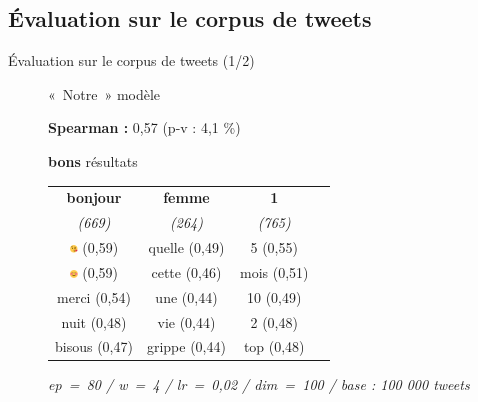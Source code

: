 \documentclass[10pt,xcolor=table,color={dvipsnames,usenames},ignorenonframetext,usepdftitle=false,french]{beamer}
\begin{document}
\hypertarget{uxe9valuation-sur-le-corpus-de-tweets}{%
\subsection{Évaluation sur le corpus de
tweets}\label{uxe9valuation-sur-le-corpus-de-tweets}}

\begin{frame}{Évaluation sur le corpus de tweets (1/2)}
\protect\hypertarget{uxe9valuation-sur-le-corpus-de-tweets-12}{}

\begin{figure}
\begin{minipage}{.4\textwidth}


« Notre » modèle

\medskip

\footnotesize
\textbf{ Spearman : } 0,57 (p-v : 4,1 \%)
\normalsize

\medskip

\faArrowCircleRight{} \textbf{bons} résultats


\end{minipage}%
\begin{minipage}{.6\textwidth}
\footnotesize

\begin{table}[!h]
\begin{center}
\begin{tabular}{|c|c|c|c|}
    \hline
\textbf{bonjour} & \textbf{femme} & \textbf{1} \tabularnewline
\emph{(669)} & \emph{(264)} & \emph{(765)} \tabularnewline
       \hline
\includegraphics[height=2mm]{img/emojis/1.png} (0,59) & quelle (0,49) & 5 (0,55) \tabularnewline
\includegraphics[height=2mm]{img/emojis/2.png} (0,59) & cette (0,46) & mois (0,51) \tabularnewline
merci (0,54) & une (0,44) & 10 (0,49) \tabularnewline
nuit (0,48) & vie (0,44) & 2 (0,48) \tabularnewline
bisous (0,47) & grippe (0,44) & top (0,48) \tabularnewline
    \hline
 \end{tabular}
\captionsetup{margin=0cm,format=hang,justification=justified}

\end{center}
\tiny
\emph{ep = 80 / w = 4 / lr = 0,02 / dim = 100 / base : 100 000 tweets}

\end{table}
\normalsize



\end{minipage}
\end{figure}
\end{frame}
\end{document}
